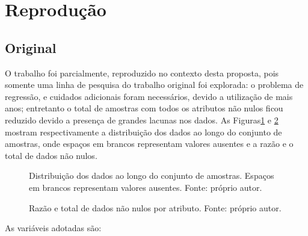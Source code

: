 \section{Reprodução}

\subsection{Original}

O trabalho \cite{REZENDE:2009} foi parcialmente, reproduzido no contexto desta proposta, pois somente uma linha de pesquisa do trabalho original foi explorada: o problema de regressão, e cuidados adicionais foram necessários, devido a utilização de mais anos; entretanto o total de amostras com todos os atributos não nulos ficou reduzido devido a presença de grandes lacunas nos dados. As Figuras\ref{fig:distribution} e \ref{fig:nulltotal} mostram respectivamente a distribuição dos dados ao longo do conjunto de amostras, onde espaços em brancos representam valores ausentes e a razão e o total de dados não nulos.

\begin{figure}[H]
\centering
{}
\caption{Distribuição dos dados ao longo do conjunto de amostras. Espaços em brancos representam valores ausentes. Fonte: próprio autor.}
\label{fig:distribution}
\end{figure}

\begin{figure}[H]
\centering
{}
\caption{Razão e total de dados não nulos por atributo. Fonte: próprio autor.}
\label{fig:nulltotal}
\end{figure}


As variáveis adotadas são:

